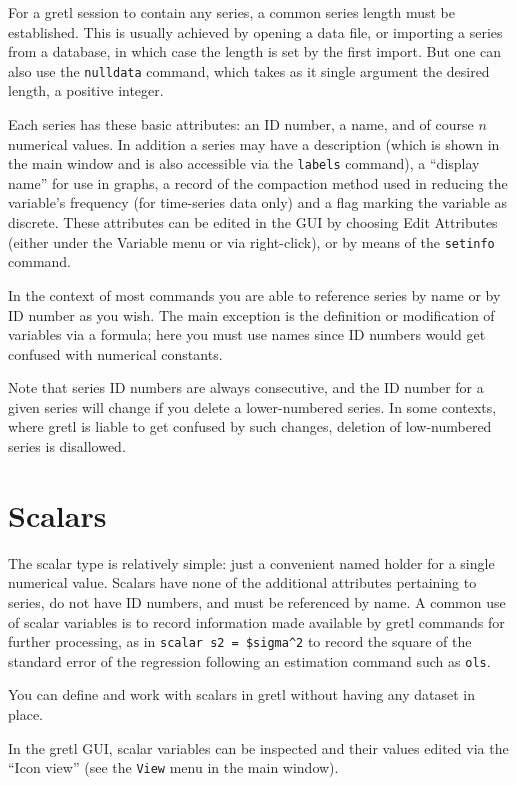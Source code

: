 For a gretl session to contain any series, a common series length must
be established. This is usually achieved by opening a data file, or
importing a series from a database, in which case the length is set by
the first import. But one can also use the \texttt{nulldata} command,
which takes as it single argument the desired length, a positive
integer.

Each series has these basic attributes: an ID number, a name, and of
course $n$ numerical values. In addition a series may have a
description (which is shown in the main window and is also accessible
via the \texttt{labels} command), a ``display name'' for use in
graphs, a record of the compaction method used in reducing the
variable's frequency (for time-series data only) and a flag marking
the variable as discrete. These attributes can be edited in the GUI by
choosing \textsf{Edit Attributes} (either under the \textsf{Variable}
menu or via right-click), or by means of the \texttt{setinfo} command.

In the context of most commands you are able to reference series by
name or by ID number as you wish. The main exception is the definition
or modification of variables via a formula; here you must use names
since ID numbers would get confused with numerical constants.

Note that series ID numbers are always consecutive, and the ID number
for a given series will change if you delete a lower-numbered series.
In some contexts, where gretl is liable to get confused by such
changes, deletion of low-numbered series is disallowed.  

\section{Scalars}
\label{sec:Scalars}

The scalar type is relatively simple: just a convenient named holder
for a single numerical value. Scalars have none of the additional
attributes pertaining to series, do not have ID numbers, and must be
referenced by name. A common use of scalar variables is to record
information made available by gretl commands for further processing,
as in \texttt{scalar s2 = \$sigma\^{}2} to record the square of the
standard error of the regression following an estimation command such
as \texttt{ols}.

You can define and work with scalars in gretl without having any
dataset in place.

In the gretl GUI, scalar variables can be inspected and their values
edited via the ``Icon view'' (see the \texttt{View} menu in the main
window).

